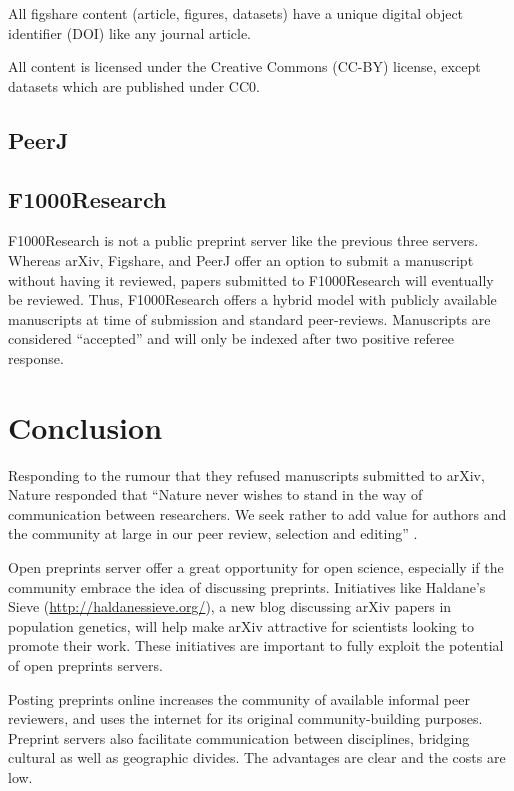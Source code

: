 \documentclass[letterpaper,twocolumn,superscriptaddress,showkeys]{revtex4}
\begin{document}
All figshare content (article, figures, datasets) have a unique digital object
identifier (DOI) like any journal article.

All content is licensed under the Creative Commons (CC-BY) license, except
datasets which are published under CC0.

\subsection{PeerJ}


\subsection{F1000Research}


F1000Research is not a public preprint server like the previous three servers.
Whereas arXiv, Figshare, and PeerJ offer an option to submit a manuscript
without having it reviewed, papers submitted to F1000Research will eventually be
reviewed. Thus, F1000Research offers a hybrid model with publicly available
manuscripts at time of submission and standard peer-reviews. Manuscripts are
considered ``accepted'' and will only be indexed after two positive referee
response.

\section{Conclusion}

Responding to the rumour that they refused manuscripts submitted to arXiv,
Nature responded that ``Nature never wishes to stand in the way of communication
between researchers. We seek rather to add value for authors and the community
at large in our peer review, selection and editing'' \cite{nat05}.

Open preprints server offer a great opportunity for open science, especially if
the community embrace the idea of discussing preprints. Initiatives like
Haldane's Sieve (\href{http://haldanessieve.org/}{http://haldanessieve.org/}), a
new blog discussing arXiv papers in population genetics, will help make arXiv
attractive for scientists looking to promote their work. These initiatives are
important to fully exploit the potential of open preprints servers.

Posting preprints online increases the community of available informal
peer reviewers, and uses the internet for its original
community-building purposes.  Preprint servers also facilitate
communication between disciplines, bridging cultural as well as
geographic divides.
The advantages are clear and the costs are low.

\newpage


\end{document}
